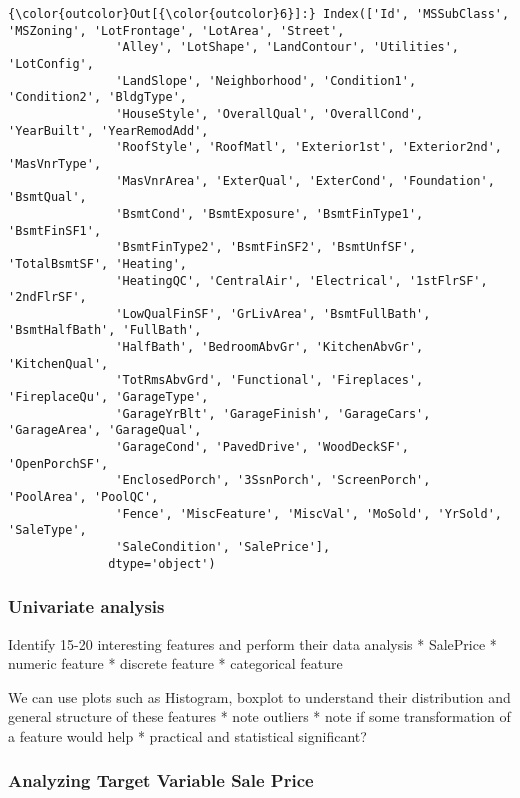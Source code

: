 \documentclass[11pt]{article}
\begin{document}
\begin{Verbatim}[commandchars=\\\{\}]
{\color{outcolor}Out[{\color{outcolor}6}]:} Index(['Id', 'MSSubClass', 'MSZoning', 'LotFrontage', 'LotArea', 'Street',
               'Alley', 'LotShape', 'LandContour', 'Utilities', 'LotConfig',
               'LandSlope', 'Neighborhood', 'Condition1', 'Condition2', 'BldgType',
               'HouseStyle', 'OverallQual', 'OverallCond', 'YearBuilt', 'YearRemodAdd',
               'RoofStyle', 'RoofMatl', 'Exterior1st', 'Exterior2nd', 'MasVnrType',
               'MasVnrArea', 'ExterQual', 'ExterCond', 'Foundation', 'BsmtQual',
               'BsmtCond', 'BsmtExposure', 'BsmtFinType1', 'BsmtFinSF1',
               'BsmtFinType2', 'BsmtFinSF2', 'BsmtUnfSF', 'TotalBsmtSF', 'Heating',
               'HeatingQC', 'CentralAir', 'Electrical', '1stFlrSF', '2ndFlrSF',
               'LowQualFinSF', 'GrLivArea', 'BsmtFullBath', 'BsmtHalfBath', 'FullBath',
               'HalfBath', 'BedroomAbvGr', 'KitchenAbvGr', 'KitchenQual',
               'TotRmsAbvGrd', 'Functional', 'Fireplaces', 'FireplaceQu', 'GarageType',
               'GarageYrBlt', 'GarageFinish', 'GarageCars', 'GarageArea', 'GarageQual',
               'GarageCond', 'PavedDrive', 'WoodDeckSF', 'OpenPorchSF',
               'EnclosedPorch', '3SsnPorch', 'ScreenPorch', 'PoolArea', 'PoolQC',
               'Fence', 'MiscFeature', 'MiscVal', 'MoSold', 'YrSold', 'SaleType',
               'SaleCondition', 'SalePrice'],
              dtype='object')
\end{Verbatim}
            
    \subsubsection{Univariate analysis}\label{univariate-analysis}

    Identify 15-20 interesting features and perform their data analysis *
SalePrice * numeric feature * discrete feature * categorical feature

We can use plots such as Histogram, boxplot to understand their
distribution and general structure of these features * note outliers *
note if some transformation of a feature would help * practical and
statistical significant?

    \subsubsection{Analyzing Target Variable Sale
Price}\label{analyzing-target-variable-sale-price}
\end{document}
